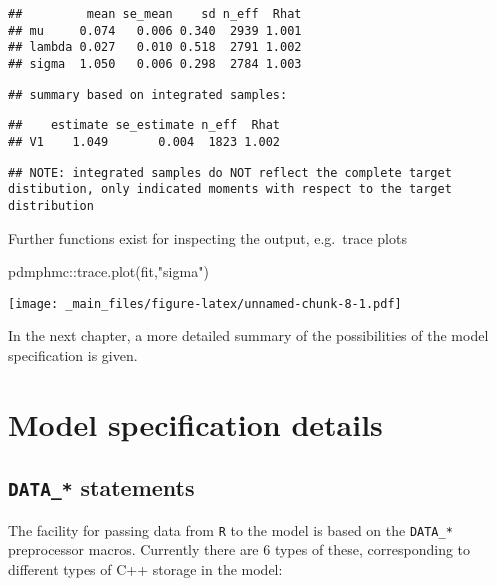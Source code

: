 \documentclass[
]{book}
\newenvironment{Shaded}{\begin{snugshade}}{\end{snugshade}}
\newcommand{\FunctionTok}[1]{\textcolor[rgb]{0.00,0.00,0.00}{#1}}
\newcommand{\NormalTok}[1]{#1}
\newcommand{\SpecialCharTok}[1]{\textcolor[rgb]{0.00,0.00,0.00}{#1}}
\newcommand{\StringTok}[1]{\textcolor[rgb]{0.31,0.60,0.02}{#1}}
\begin{document}
\begin{verbatim}
##         mean se_mean    sd n_eff  Rhat
## mu     0.074   0.006 0.340  2939 1.001
## lambda 0.027   0.010 0.518  2791 1.002
## sigma  1.050   0.006 0.298  2784 1.003
\end{verbatim}

\begin{verbatim}
## summary based on integrated samples:
\end{verbatim}

\begin{verbatim}
##    estimate se_estimate n_eff  Rhat
## V1    1.049       0.004  1823 1.002
\end{verbatim}

\begin{verbatim}
## NOTE: integrated samples do NOT reflect the complete target distibution, only indicated moments with respect to the target distribution
\end{verbatim}

Further functions exist for inspecting the output, e.g.~trace plots

\begin{Shaded}
\begin{Highlighting}[]
\NormalTok{pdmphmc}\SpecialCharTok{::}\FunctionTok{trace.plot}\NormalTok{(fit,}\StringTok{"sigma"}\NormalTok{)}
\end{Highlighting}
\end{Shaded}

\texttt{[image: \_main\_files/figure-latex/unnamed-chunk-8-1.pdf]}

In the next chapter, a more detailed summary of the possibilities of the model specification is given.

\hypertarget{model-specification-details}{%
\chapter{Model specification details}\label{model-specification-details}}

\hypertarget{data_-statements}{%
\section{\texorpdfstring{\texttt{DATA\_*} statements}{DATA\_* statements}}\label{data_-statements}}

The facility for passing data from \texttt{R} to the model is based on the \texttt{DATA\_*} preprocessor macros. Currently there are 6 types of these, corresponding to different types of C++ storage in the model:
\end{document}
